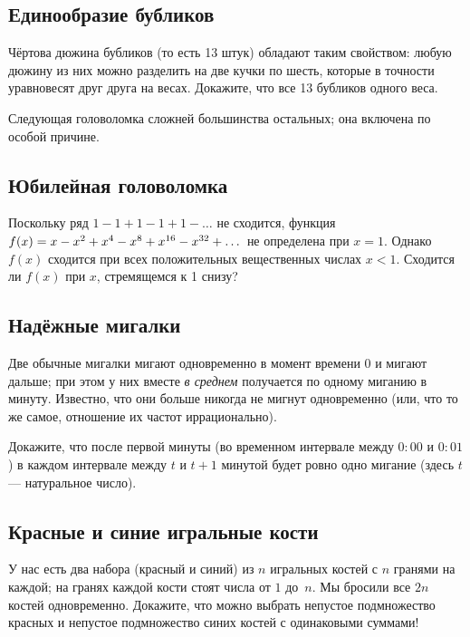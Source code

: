 \subsection*{Единообразие бубликов}\label{Единообразие бубликов}

Чёртова дюжина бубликов (то есть 13 штук) обладают таким свойством: любую дюжину из них можно разделить на две кучки по шесть, которые в точности уравновесят друг друга на весах.
Докажите, что все 13 бубликов одного веса.

\medskip

{\sloppy 

Следующая головоломка сложней большинства остальных;
она включена по особой причине.

}

\subsection*{Юбилейная головоломка}

Поскольку ряд $1 - 1 + 1 - 1 + 1 - \dots$ не сходится,  функция 
$f(x)\z=x-x^2+x^4-x^8+x^{16}-x^{32}+\dots$ не определена при $x=1$.
Однако $f(x)$ сходится при всех положительных вещественных числах $x<1$.
Сходится ли $f(x)$ при $x$, стремящемся к 1 снизу?

\subsection*{Надёжные мигалки}\label{Надёжные мигалки}

Две обычные мигалки мигают одновременно в момент времени $0$
и мигают дальше; при этом у них вместе \emph{в среднем} получается по одному миганию в минуту.
Известно, что они больше никогда не мигнут одновременно (или, что то же самое, отношение их частот иррационально).

Докажите, что после первой минуты (во временном интервале между $0{:}00$ и $0{:}01$) в каждом интервале между $t$ и $t + 1$ минутой будет ровно одно мигание (здесь $t$ --- натуральное число).

\subsection*{Красные и синие игральные кости}\label{Красные и синие игральные кости}

У нас есть два набора (красный и синий) из $n$ игральных костей с $n$ гранями на каждой;
на гранях каждой кости стоят числа от $1$ до~$n$.
Мы бросили все $2n$ костей одновременно.
Докажите, что можно выбрать непустое подмножество красных и непустое подмножество синих костей с одинаковыми суммами!

